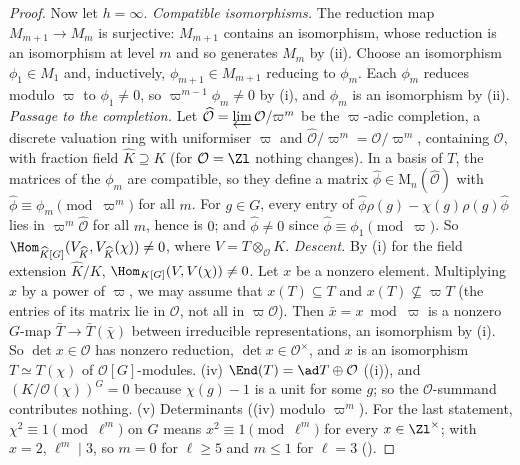 \begin{proof}
Now let $h=\infty$. \emph{Compatible isomorphisms.} The reduction map $M_{m+1}\to M_m$ is surjective: $M_{m+1}$ contains an isomorphism, whose
reduction is an isomorphism at level $m$ and so generates $M_m$ by (ii). Choose an isomorphism $\phi_1\in M_1$ and, inductively, $\phi_{m+1}\in M_{m+1}$
reducing to $\phi_m$. Each $\phi_m$ reduces modulo $\varpi$ to $\phi_1\ne0$, so $\varpi^{m-1}\phi_m\ne0$ by (i), and $\phi_m$ is an isomorphism by (ii).
\emph{Passage to the completion.} Let $\widehat{\mathcal{O}}=\varprojlim\mathcal{O}/\varpi^m$ be the $\varpi$-adic completion, a discrete valuation ring with
uniformiser $\varpi$ and $\widehat{\mathcal{O}}/\varpi^m=\mathcal{O}/\varpi^m$, containing $\mathcal{O}$, with fraction field $\widehat K\supseteq K$ (for $\mathcal{O}=\Zl$ nothing
changes). In a basis of $T$, the matrices of the $\phi_m$ are compatible, so they define a matrix $\hat\phi\in\mathrm M_n(\widehat{\mathcal{O}})$ with
$\hat\phi\equiv\phi_m\pmod{\varpi^m}$ for all $m$. For $g\in G$, every entry of $\hat\phi\rho(g)-\chi(g)\rho(g)\hat\phi$ lies in $\varpi^m\widehat{\mathcal{O}}$ for all $m$, hence is $0$;
and $\hat\phi\ne0$ since $\hat\phi\equiv\phi_1\pmod\varpi$. So $\Hom_{\widehat K[G]}(V_{\widehat K},V_{\widehat K}(\chi))\ne0$, where $V=T\otimes_{\mathcal{O}}K$.
\emph{Descent.} By (i) for the field extension $\widehat K/K$, $\Hom_{K[G]}(V,V(\chi))\ne0$. Let $x$ be a nonzero element. Multiplying
$x$ by a power of $\varpi$, we may assume that $x(T)\subseteq T$ and $x(T)\not\subseteq\varpi T$ (the entries of its matrix lie in $\mathcal{O}$, not all in
$\varpi\mathcal{O}$). Then $\bar x=x\bmod\varpi$ is a nonzero $G$-map $\bar T\to\bar T(\bar\chi)$ between irreducible representations, an isomorphism by
(i). So $\det x\in\mathcal{O}$ has nonzero reduction, $\det x\in\mathcal{O}^\times$, and $x$ is an isomorphism $T\simeq T(\chi)$ of
$\mathcal{O}[G]$-modules.
(iv) $\End(T)=\ad T\oplus\mathcal{O}$ ((i)), and $(K/\mathcal{O}(\chi))^G=0$ because $\chi(g)-1$ is a unit for some $g$; so the $\mathcal{O}$-summand contributes
nothing.
(v) Determinants ((iv) modulo $\varpi^m$). For the last statement, $\chi^2\equiv1\pmod{\ell^m}$ on $G$ means $x^2\equiv1\pmod{\ell^m}$ for every
$x\in\Zl^\times$; with $x=2$, $\ell^m\mid3$, so $m=0$ for $\ell\ge5$ and $m\le1$ for $\ell=3$ ().
\end{proof}

